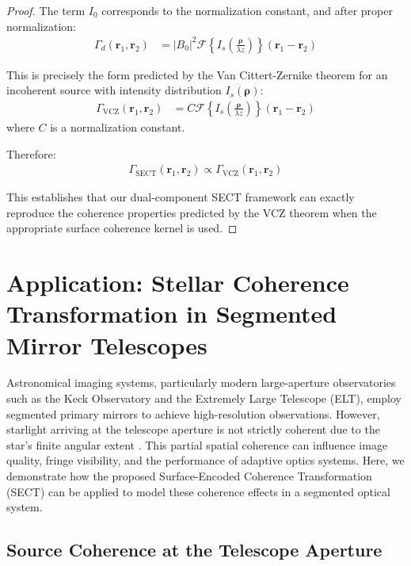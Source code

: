 \documentclass[a4paper,12pt]{article}
\begin{document}
\begin{proof}
The term $I_0$ corresponds to the normalization constant, and after proper normalization:
\begin{align}
\Gamma_d(\mathbf{r}_1, \mathbf{r}_2) &= |B_0|^2 \mathcal{F}\left\{I_s\left(\frac{\mathbf{\rho}}{\lambda z}\right)\right\}(\mathbf{r}_1-\mathbf{r}_2)
\end{align}

This is precisely the form predicted by the Van Cittert-Zernike theorem for an incoherent source with intensity distribution $I_s(\mathbf{\rho})$:
\begin{align}
\Gamma_{\text{VCZ}}(\mathbf{r}_1, \mathbf{r}_2) &= C \mathcal{F}\left\{I_s\left(\frac{\mathbf{\rho}}{\lambda z}\right)\right\}(\mathbf{r}_1-\mathbf{r}_2)
\end{align}
where $C$ is a normalization constant.

Therefore:
\begin{align}
\Gamma_{\text{SECT}}(\mathbf{r}_1, \mathbf{r}_2) \propto \Gamma_{\text{VCZ}}(\mathbf{r}_1, \mathbf{r}_2)
\end{align}

This establishes that our dual-component SECT framework can exactly reproduce the coherence properties predicted by the VCZ theorem when the appropriate surface coherence kernel is used.
\end{proof}


\section{Application: Stellar Coherence Transformation in Segmented Mirror Telescopes} \label{appendix:Stellar_Coherence_Transformation}

Astronomical imaging systems, particularly modern large-aperture observatories such as the Keck Observatory and the Extremely Large Telescope (ELT), employ segmented primary mirrors to achieve high-resolution observations. 
However, starlight arriving at the telescope aperture is not strictly coherent due to the star’s finite angular 
extent \cite{Monnier2003}. 
This partial spatial coherence can influence image quality, fringe visibility, and the performance of adaptive optics 
systems. Here, we demonstrate how the proposed Surface-Encoded Coherence Transformation (SECT) can be applied to model 
these coherence effects in a segmented optical system.

\subsection{Source Coherence at the Telescope Aperture}
\end{document}

